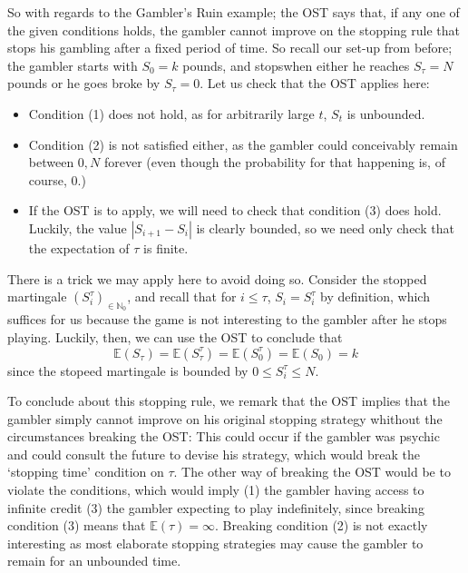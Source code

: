 	So with regards to the Gambler's Ruin example; the OST says that, if any one of the given 
	conditions holds, the gambler cannot improve on the stopping rule that stops his gambling 
	after a fixed period of time. So recall our set-up from before; the gambler starts with 
	$S_0 = k$ pounds, and stopswhen either he reaches $S_\tau = N$ pounds or he goes broke by 
	$S_\tau = 0$. Let us check that the OST applies here:
	\begin{itemize}
		\item Condition (1) does not hold, as for arbitrarily large $t$, $S_t$ is unbounded.
		\item Condition (2) is not satisfied either, as the gambler could conceivably remain
		between $0,N$ forever (even though the probability for that happening is, 
		of course, $0$.)
		\item If the OST is to apply, we will need to check that condition (3) does hold. 
		Luckily, the value $|S_{i+1} - S_i|$ is clearly bounded, so we need only check that 
		the expectation of $\tau$ is finite.
	\end{itemize}
	There is a trick we may apply here to avoid doing so. Consider the stopped martingale 
	$(S_i^\tau)_{\in\mathbb{N}_0}$, and recall that for $i\leq\tau$, $S_i = S_i^\tau$ 
	by definition, which suffices for us because the game is not interesting to the 
	gambler after he stops playing. Luckily, then, we can use the OST to conclude that
	$$
		\mathbb{E}(S_\tau) = \mathbb{E}(S_\tau^\tau) = \mathbb{E}(S_0^\tau) = 
		\mathbb{E}(S_0) = k
	$$
	since the stopeed martingale is bounded by $0 \leq S_i^\tau \leq N$.

	To conclude about this stopping rule, we remark that the OST implies that the gambler 
	simply cannot improve on his original stopping strategy whithout the circumstances 
	breaking the OST: This could occur if the gambler was psychic and could consult the future 
	to devise his strategy, which would break the `stopping time' condition on $\tau$. The 
	other way of breaking the OST would be to violate the conditions, which would imply (1) 
	the gambler having access to infinite credit (3) the gambler expecting to play indefinitely,
	since breaking condition (3) means that $\mathbb{E}(\tau) = \infty$. Breaking condition (2)
	is not exactly interesting as most elaborate stopping strategies may cause the gambler to 
	remain for an unbounded time.

